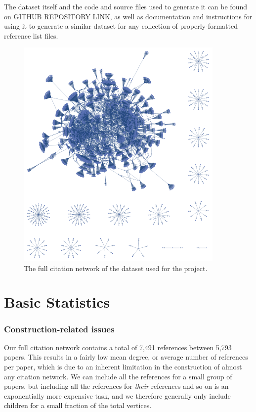 \documentclass[12pt]{thesis}
\theoremstyle{plain}
\theoremstyle{definition}
\theoremstyle{remark}
\begin{document}
The dataset itself and the code and source files used to generate it can be found on GITHUB REPOSITORY LINK, as well as documentation and instructions for using it to generate a similar dataset for any collection of properly-formatted reference list files.

\begin{figure}[p]
\centering
\includegraphics[width=0.9\textwidth]{full_citation_network.png}
\caption{The full citation network of the dataset used for the project.}
\label{fig:full_database}
\end{figure}








\section{Basic Statistics}


\subsubsection{Construction-related issues}

Our full citation network contains a total of 7,491 references between 5,793 papers. This results in a fairly low mean degree, or average number of references per paper, which is due to an inherent limitation in the construction of almost any citation network. We can include all the references for a small group of papers, but including all the references for \textit{their} references and so on is an exponentially more expensive task, and we therefore generally only include children for a small fraction of the total vertices. 
\end{document}
